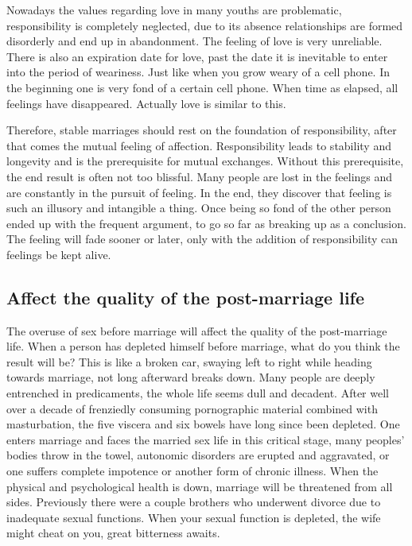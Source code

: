 \documentclass[
]{book}
\begin{document}
Nowadays the values regarding love in many youths are problematic, responsibility is completely neglected, due to its absence relationships are formed disorderly and end up in abandonment. The feeling of love is very unreliable. There is also an expiration date for love, past the date it is inevitable to enter into the period of weariness. Just like when you grow weary of a cell phone. In the beginning one is very fond of a certain cell phone. When time as elapsed, all feelings have disappeared. Actually love is similar to this.

Therefore, stable marriages should rest on the foundation of responsibility, after that comes the mutual feeling of affection. Responsibility leads to stability and longevity and is the prerequisite for mutual exchanges. Without this prerequisite, the end result is often not too blissful. Many people are lost in the feelings and are constantly in the pursuit of feeling. In the end, they discover that feeling is such an illusory and intangible a thing. Once being so fond of the other person ended up with the frequent argument, to go so far as breaking up as a conclusion. The feeling will fade sooner or later, only with the addition of responsibility can feelings be kept alive.

\hypertarget{affect-the-quality-of-the-post-marriage-life}{%
\subsection{Affect the quality of the post-marriage life}\label{affect-the-quality-of-the-post-marriage-life}}

The overuse of sex before marriage will affect the quality of the post-marriage life. When a person has depleted himself before marriage, what do you think the result will be? This is like a broken car, swaying left to right while heading towards marriage, not long afterward breaks down. Many people are deeply entrenched in predicaments, the whole life seems dull and decadent. After well over a decade of frenziedly consuming pornographic material combined with masturbation, the five viscera and six bowels have long since been depleted. One enters marriage and faces the married sex life in this critical stage, many peoples' bodies throw in the towel, autonomic disorders are erupted and aggravated, or one suffers complete impotence or another form of chronic illness. When the physical and psychological health is down, marriage will be threatened from all sides. Previously there were a couple brothers who underwent divorce due to inadequate sexual functions. When your sexual function is depleted, the wife might cheat on you, great bitterness awaits.
\end{document}
